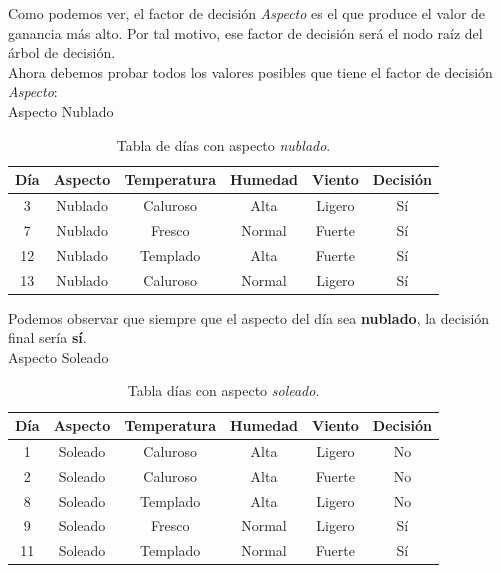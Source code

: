 \begin{UClist}
	\UCli Como podemos ver, el factor de decisión \emph{Aspecto} es el que produce el valor de ganancia más alto. Por tal motivo, ese factor de decisión será el nodo raíz del árbol de decisión.\\

	\UCli Ahora debemos probar todos los valores posibles que tiene el factor de decisión \emph{Aspecto}:\\

	\UCli Aspecto Nublado\\
	\begin{table}[H]
		\begin{center}
			\label{tab:tablaInduccionAspectoNublado}
			\begin{tabular}{c|c|c|c|c|c}
				\textbf{Día} & \textbf{Aspecto} & \textbf{Temperatura} & \textbf{Humedad} & \textbf{Viento} & \textbf{Decisión}\\
				\hline
				3 & Nublado & Caluroso & Alta & Ligero & Sí\\
				7 & Nublado & Fresco & Normal & Fuerte & Sí\\
				12 & Nublado & Templado & Alta & Fuerte & Sí\\
				13 & Nublado & Caluroso & Normal & Ligero & Sí\\
			\end{tabular}
		\end{center}
		\caption{Tabla de días con aspecto \emph{nublado}.}
	\end{table}

	Podemos observar que siempre que el aspecto del día sea \textbf{nublado}, la decisión final sería \textbf{sí}.\\

	\UCli Aspecto Soleado\\
	\begin{table}[H]
		\begin{center}
			\label{tab:tablaInduccionAspectoSoleado}
			\begin{tabular}{c|c|c|c|c|c}
				\textbf{Día} & \textbf{Aspecto} & \textbf{Temperatura} & \textbf{Humedad} & \textbf{Viento} & \textbf{Decisión}\\
				\hline
				1 & Soleado & Caluroso & Alta & Ligero & No\\
				2 & Soleado & Caluroso & Alta & Fuerte & No\\
				8 & Soleado & Templado & Alta & Ligero & No\\
				9 & Soleado & Fresco & Normal & Ligero & Sí\\
				11 & Soleado & Templado & Normal & Fuerte & Sí\\
			\end{tabular}
		\end{center}
		\caption{Tabla días con aspecto \emph{soleado}.}
	\end{table}


\end{UClist}
